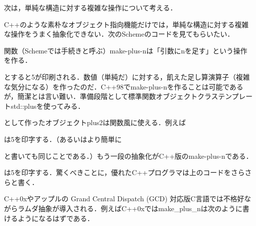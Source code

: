 \documentclass[a4paper,twocolumn]{jsbook}
\begin{document}
次は，単純な構造に対する複雑な操作について考える．

C++のような素朴なオブジェクト指向機能だけでは，単純な構造に対する複雑な操作をうまく抽象化できない．次のSchemeのコードを見てもらいたい．


関数（Schemeでは手続きと呼ぶ）make-plus-nは「引数にnを足す」という操作を作る．


とすると5が印刷される．数値（単純だ）に対する，飢えた足し算演算子（複雑な気分になる）を作ったのだ．C++98でmake-plus-nを作ることは可能であるが，簡潔とは言い難い．準備段階として標準関数オブジェクトクラステンプレートstd::plusを使ってみる．


として作ったオブジェクトplus2は関数風に使える．例えば


は5を印字する．（あるいはより簡単に


と書いても同じことである．）もう一段の抽象化がC++版のmake-plus-nである．


は5を印字する．驚くべきことに，優れたC++プログラマは上のコードをさらさらと書く．

C++0xやアップルの Grand Central Dispatch (GCD) 対応版C言語では不格好ながらラムダ抽象が導入される．例えばC++0xではmake\_plus\_nは次のように書けるようになるはずである．
\end{document}
